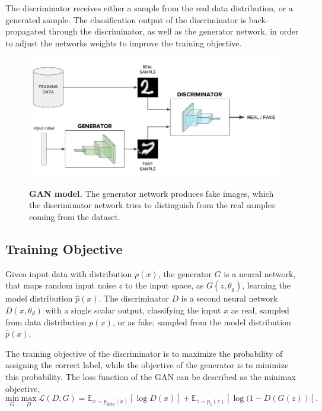 \documentclass[12pt]{report}
\begin{document}
The discriminator receives either a sample from the real data distribution, or a generated sample. The classification output of the discriminator is back-propagated  through the discriminator, as well as the generator network, in order to adjust the networks weights to improve the training objective.

\begin{figure}[h]
\centering
{\includegraphics[width=\linewidth]{02_background/gan_model}}
\caption{\label{fig:gan} \textbf{GAN model.} The generator network produces fake images, which the discriminator network tries to distinguish from the real samples coming from the dataset.}
\end{figure}

\subsection{Training Objective} \label{sec:GAN_training}

Given input data with distribution $p(x)$, the generator $G$ is a neural network, that maps random input noise $z$ to the input space, as $G(z, \theta_{g})$, learning the model distribution $\hat{p}(x)$. The discriminator $D$ is a second neural network $D(x, \theta_{d})$ with a single scalar output, classifying the input $x$ as real, sampled from data distribution $p(x)$, or as fake, sampled from the model distribution $\hat{p}(x)$. 

The training objective of the discriminator is to maximize the probability of assigning the correct label, while the objective of the generator is to minimize this probability. The loss function of the GAN can be described as the minimax objective,
\begin{equation}
\underset{G}{\mathrm{min}} \ \underset{D}{\mathrm{max}} \ \mathcal{L}(D,G) = \mathbb{E}_{x \sim p_{data}(x)}[\log D(x)] + \mathbb{E}_{z \sim p_{z}(z)}[\log (1 - D(G(z))].
\label{eq:minimax}
\end{equation}
\end{document}
